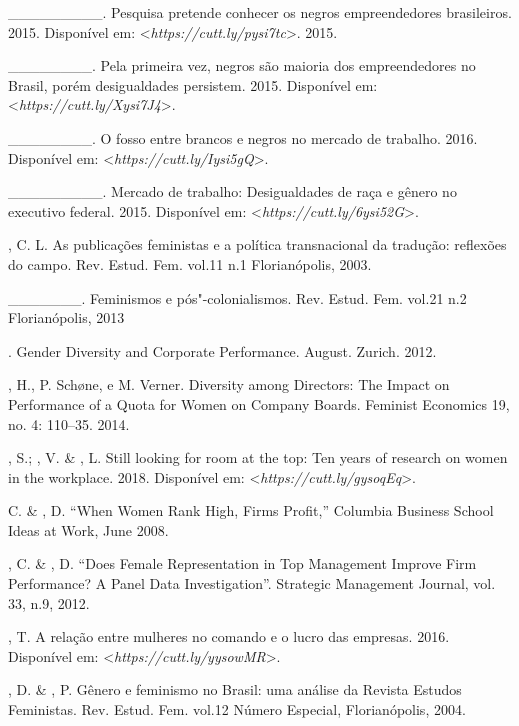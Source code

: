 \begin{Parskip}
\_\_\_\_\_\_\_\_\_. Pesquisa pretende conhecer os negros empreendedores
brasileiros. 2015.
Disponível em: \textless{}\emph{https://cutt.ly/pysi7tc}\textgreater{}.
2015.

\_\_\_\_\_\_\_\_. Pela primeira vez, negros são maioria dos
empreendedores no Brasil, porém desigualdades persistem. 2015.
Disponível em: \textless{}\emph{https://cutt.ly/Xysi7J4}\textgreater{}.

\_\_\_\_\_\_\_\_. O fosso entre brancos e negros no mercado de trabalho.
2016.
Disponível em: \textless{}\emph{https://cutt.ly/Iysi5gQ}\textgreater{}.

\_\_\_\_\_\_\_\_\_. Mercado de trabalho: Desigualdades de raça e gênero
no executivo federal. 2015.
Disponível em: \textless{}\emph{https://cutt.ly/6ysi52G}\textgreater{}.

, C. L. As publicações feministas e a política transnacional da
tradução: reflexões do campo. Rev. Estud. Fem. vol.11 n.1 Florianópolis,
2003.

\_\_\_\_\_\_\_. Feminismos e pós"-colonialismos. Rev. Estud. Fem. vol.21
n.2 Florianópolis, 2013

. Gender Diversity and Corporate
Performance. August. Zurich. 2012.

, H., P. Schøne, e M. Verner. Diversity among Directors: The
Impact on Performance of a Quota for Women on Company Boards. Feminist
Economics 19, no. 4: 110--35. 2014.

, S.; , V. \& , L. Still looking for room at the top:
Ten years of research on women in the workplace. 2018.
Disponível em: \textless{}\emph{https://cutt.ly/gysoqEq}\textgreater{}.

 C. \& , D. ``When Women Rank High, Firms Profit,'' Columbia
Business School Ideas at Work, June 2008.

, C. \& , D. ``Does Female Representation in Top Management
Improve Firm Performance? A Panel Data Investigation''. Strategic
Management Journal, vol. 33, n.9, 2012.

, T. A relação entre mulheres no comando e o lucro das empresas.
2016.
Disponível em: \textless{}\emph{https://cutt.ly/yysowMR}\textgreater{}.

, D. \& , P. Gênero e feminismo no Brasil: uma análise da
Revista Estudos Feministas. Rev. Estud. Fem. vol.12 Número Especial,
Florianópolis, 2004.


\end{Parskip}
